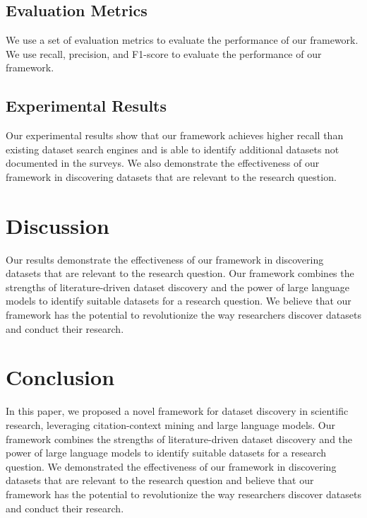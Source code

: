 \documentclass{article}
\begin{document}
        \subsection{Evaluation Metrics}

        We use a set of evaluation metrics to evaluate the performance of our framework. We use recall, precision, and F1-score to evaluate the performance of our framework.

        \subsection{Experimental Results}

        Our experimental results show that our framework achieves higher recall than existing dataset search engines and is able to identify additional datasets not documented in the surveys. We also demonstrate the effectiveness of our framework in discovering datasets that are relevant to the research question.

        \section{Discussion}

        Our results demonstrate the effectiveness of our framework in discovering datasets that are relevant to the research question. Our framework combines the strengths of literature-driven dataset discovery and the power of large language models to identify suitable datasets for a research question. We believe that our framework has the potential to revolutionize the way researchers discover datasets and conduct their research.

        \section{Conclusion}

        In this paper, we proposed a novel framework for dataset discovery in scientific research, leveraging citation-context mining and large language models. Our framework combines the strengths of literature-driven dataset discovery and the power of large language models to identify suitable datasets for a research question. We demonstrated the effectiveness of our framework in discovering datasets that are relevant to the research question and believe that our framework has the potential to revolutionize the way researchers discover datasets and conduct their research.
\end{document}
